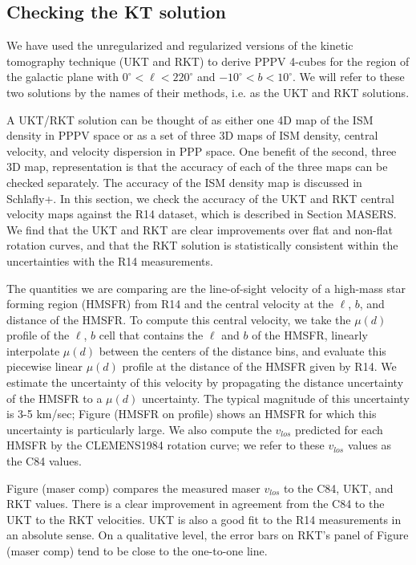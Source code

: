 \subsection{Checking the KT solution}
\label{sec:check_solution}

We have used the unregularized and regularized versions of the kinetic tomography technique (UKT and RKT) to derive PPPV 4-cubes for the region of the galactic plane with $0^\circ < \ell < 220^\circ$ and $-10^\circ < b < 10^\circ$. We will refer to these two solutions by the names of their methods, i.e. as the UKT and RKT solutions. 

A UKT/RKT solution can be thought of as either one 4D map of the ISM density in PPPV space or as a set of three 3D maps of ISM density, central velocity, and velocity dispersion in PPP space. One benefit of the second, three 3D map, representation is that the accuracy of each of the three maps can be checked separately. The accuracy of the ISM density map is discussed in Schlafly+. In this section, we check the accuracy of the UKT and RKT central velocity maps against the R14 dataset, which is described in Section MASERS. We find that the UKT and RKT are clear improvements over flat and non-flat rotation curves, and that the RKT solution is statistically consistent within the uncertainties with the R14 measurements. 

The quantities we are comparing are the line-of-sight velocity of a high-mass star forming region (HMSFR) from R14 and the central velocity at the $\ell$, $b$, and distance of the HMSFR. To compute this central velocity, we take the $\mu(d)$ profile of the $\ell$, $b$ cell that contains the $\ell$ and $b$ of the HMSFR, linearly interpolate $\mu(d)$ between the centers of the distance bins, and evaluate this piecewise linear $\mu(d)$ profile at the distance of the HMSFR given by R14. We estimate the uncertainty of this velocity by propagating the distance uncertainty of the HMSFR to a $\mu(d)$ uncertainty. The typical magnitude of this uncertainty is 3-5 km/sec; Figure (HMSFR on profile) shows an HMSFR for which this uncertainty is particularly large. We also compute the $v_{los}$ predicted for each HMSFR by the CLEMENS1984 rotation curve; we refer to these $v_{los}$ values as the C84 values. 

Figure (maser comp) compares the measured maser $v_{los}$ to the C84, UKT, and  RKT values. There is a clear improvement in agreement from the C84 to the UKT to the RKT velocities. UKT is also a good fit to the R14 measurements in an absolute sense. On a qualitative level, the error bars on RKT's panel of Figure (maser comp) tend to be close to the one-to-one line. 

